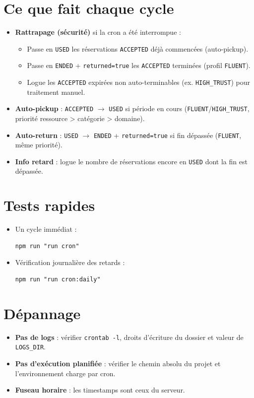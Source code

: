 \documentclass{article}
\begin{document}
\section*{Ce que fait chaque cycle}
\begin{itemize}[leftmargin=1.2em]
  \item \textbf{Rattrapage (sécurité)} si la cron a été interrompue :
  \begin{itemize}
    \item Passe en \texttt{USED} les réservations \texttt{ACCEPTED} déjà commencées (auto-pickup).
    \item Passe en \texttt{ENDED} + \texttt{returned=true} les \texttt{ACCEPTED} terminées (profil \texttt{FLUENT}).
    \item Logue les \texttt{ACCEPTED} expirées non auto-terminables (ex. \texttt{HIGH\_TRUST}) pour traitement manuel.
  \end{itemize}
  \item \textbf{Auto-pickup} : \texttt{ACCEPTED} \(\rightarrow\) \texttt{USED} si période en cours (\texttt{FLUENT}/\texttt{HIGH\_TRUST}, priorité ressource > catégorie > domaine).
  \item \textbf{Auto-return} : \texttt{USED} \(\rightarrow\) \texttt{ENDED} + \texttt{returned=true} si fin dépassée (\texttt{FLUENT}, même priorité).
  \item \textbf{Info retard} : logue le nombre de réservations encore en \texttt{USED} dont la fin est dépassée.
\end{itemize}


\section*{Tests rapides}
\begin{itemize}[leftmargin=1.2em]
  \item Un cycle immédiat :
\begin{verbatim}
npm run "run cron"
\end{verbatim}
  \item Vérification journalière des retards :
\begin{verbatim}
npm run "run cron:daily"
\end{verbatim}
\end{itemize}

\section*{Dépannage}
\begin{itemize}[leftmargin=1.2em]
  \item \textbf{Pas de logs} : vérifier \texttt{crontab -l}, droits d'écriture du dossier et valeur de \texttt{LOGS\_DIR}.
  \item \textbf{Pas d'exécution planifiée} : vérifier le chemin absolu du projet et l'environnement charge par cron.
  \item \textbf{Fuseau horaire} : les timestamps sont ceux du serveur.
\end{itemize}
\end{document}

